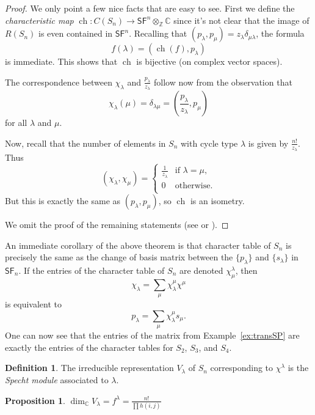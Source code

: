 \documentclass[12pt]{article}
\theoremstyle{plain}
\newtheorem{proposition}[theorem]{Proposition}
\theoremstyle{definition}
\newtheorem{definition}[theorem]{Definition}
\theoremstyle{remark}
\numberwithin{equation}{section}
\begin{document}
\begin{proof}
We only point a few nice facts that are easy to see.
First we define the \emph{characteristic map}
$\operatorname{ch} : C(S_n) \to
\mathsf{SF}^n \otimes_{\mathbb{Z}} \mathbb{C}$
since it's not clear that the image of $R(S_n)$ is even
contained in $\mathsf{SF}^n$.
Recalling that $(p_\lambda,p_\mu)=z_\lambda \delta_{\mu \lambda}$,
the formula
\[
f(\lambda) = ( \operatorname{ch}(f), p_\lambda )
\]
is immediate.  This shows that $\operatorname{ch}$ is bijective
(on complex vector spaces).

The correspondence between
$\chi_\lambda$ and $\frac{p_{\lambda}}{z_\lambda}$
follow now from the observation that
\[
\chi_\lambda(\mu) = \delta_{\lambda \mu} =
\left(\frac{p_{\lambda}}{z_\lambda}, p_\mu\right)
\]
for all $\lambda$ and $\mu$.

Now, recall that the number of elements in $S_n$ with cycle type
$\lambda$ is given by $\frac{n!}{z_\lambda}$.  Thus
\[
(\chi_\lambda, \chi_\mu) =
\begin{cases}
\frac{1}{z_\lambda} & \textrm{if $\lambda=\mu$,}\\
0 & \textrm{otherwise.}\\
\end{cases}
\]
But this is exactly the same as $(p_\lambda,p_\mu)$,
so $\operatorname{ch}$ is an isometry.

We omit the proof of the remaining statements
(see \cite[\S{I.7}]{Macdonald} or \cite[\S{7.18}]{Stanley2}).
\end{proof}

An immediate corollary of the above theorem is that
character table of $S_n$ is precisely the same
as the change of basis matrix between the $\{ p_\lambda \}$
and $\{ s_\lambda \}$ in $\mathsf{SF}_n$.
If the entries of the character table of $S_n$ are denoted
$\chi_\mu^\lambda$, then
\[
\chi_\lambda = \sum_{\mu} \chi_\lambda^\mu \chi^\mu
\]
is equivalent to
\[
p_\lambda = \sum_{\mu} \chi_\lambda^\mu s_\mu .
\]
One can now see that the entries of the matrix from Example~\ref{ex:transSP}
are exactly the entries of the character tables for $S_2$, $S_3$, and
$S_4$.

\begin{definition}
The irreducible representation $V_\lambda$ of $S_n$ corresponding to
$\chi^\lambda$ is the \emph{Specht module} associated to $\lambda$.
\end{definition}

\begin{proposition}
$\displaystyle \dim_{\mathbb{C}} V_\lambda = f^\lambda
=\frac{n!}{\prod h(i,j)}$
\end{proposition}
\end{document}
